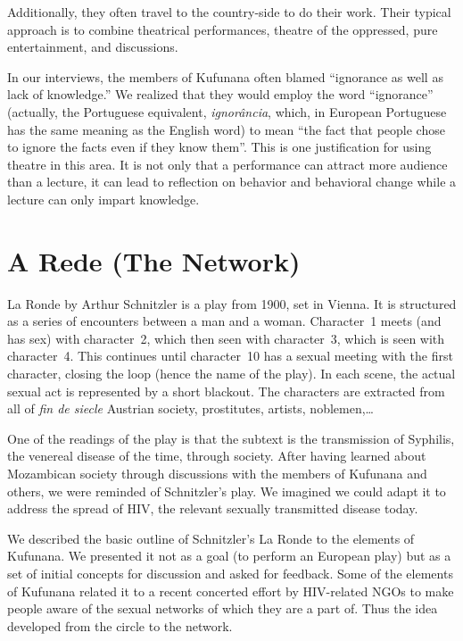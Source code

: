 \documentclass[article,twocolumn,twoside]{memoir}
\begin{document}
Additionally, they often travel to the country-side to do their work. Their
typical approach is to combine theatrical performances, theatre of the
oppressed, pure entertainment, and discussions.

In our interviews, the members of Kufunana often blamed ``ignorance as well as
lack of knowledge.'' We realized that they would employ the word ``ignorance''
(actually, the Portuguese equivalent, \textit{ignor\^{a}ncia}, which, in
European Portuguese has the same meaning as the English word) to mean ``the
fact that people chose to ignore the facts even if they know them''. This is
one justification for using theatre in this area. It is not only that a
performance can attract more audience than a lecture, it can lead to reflection
on behavior and behavioral change while a lecture can only impart knowledge.

\chapter{A Rede (The Network)}
La Ronde by Arthur Schnitzler is a play from 1900, set in Vienna. It is
structured as a series of encounters between a man and a woman. Character~1
meets (and has sex) with character~2, which then seen with character~3, which
is seen with character~4. This continues until character~10 has a sexual
meeting with the first character, closing the loop (hence the name of the
play). In each scene, the actual sexual act is represented by a short blackout.
The characters are extracted from all of \textit{fin de siecle} Austrian
society, prostitutes, artists, noblemen,\ldots

One of the readings of the play is that the subtext is the transmission of
Syphilis, the venereal disease of the time, through society. After having
learned about Mozambican society through discussions with the members of
Kufunana and others, we were reminded of Schnitzler's play. We imagined we
could adapt it to address the spread of HIV, the relevant sexually transmitted
disease today.

We described the basic outline of Schnitzler's La Ronde to the elements of
Kufunana. We presented it not as a goal (to perform an European play) but as a
set of initial concepts for discussion and asked for feedback. Some of the
elements of Kufunana related it to a recent concerted effort by HIV-related
NGOs to make people aware of the sexual networks of which they are a part of.
Thus the idea developed from the circle to the network.
\end{document}

